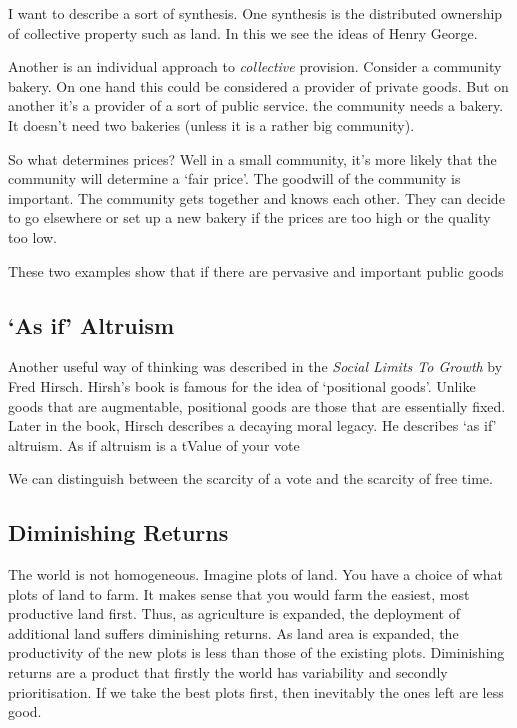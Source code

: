 \documentclass[]{tufte-handout}
\begin{document}
I want to describe a sort of synthesis. One synthesis is the distributed
ownership of collective property such as land. In this we see the ideas
of Henry George.

Another is an individual approach to \emph{collective} provision.
Consider a community bakery. On one hand this could be considered a
provider of private goods. But on another it's a provider of a sort of
public service. the community needs a bakery. It doesn't need two
bakeries (unless it is a rather big community).

So what determines prices? Well in a small community, it's more likely
that the community will determine a `fair price'. The goodwill of the
community is important. The community gets together and knows each
other. They can decide to go elsewhere or set up a new bakery if the
prices are too high or the quality too low.

These two examples show that if there are pervasive and important public
goods

\hypertarget{as-if-altruism}{%
\subsection{`As if' Altruism}\label{as-if-altruism}}

Another useful way of thinking was described in the \emph{Social Limits
To Growth} by Fred Hirsch. Hirsh's book is famous for the idea of
`positional goods'. Unlike goods that are augmentable, positional goods
are those that are essentially fixed. Later in the book, Hirsch
describes a decaying moral legacy. He describes `as if' altruism. As if
altruism is a tValue of your vote

We can distinguish between the scarcity of a vote and the scarcity of
free time.

\hypertarget{diminishing-returns}{%
\subsection{Diminishing Returns}\label{diminishing-returns}}

The world is not homogeneous. Imagine plots of land. You have a choice
of what plots of land to farm. It makes sense that you would farm the
easiest, most productive land first. Thus, as agriculture is expanded,
the deployment of additional land suffers diminishing returns. As land
area is expanded, the productivity of the new plots is less than those
of the existing plots. Diminishing returns are a product that firstly
the world has variability and secondly prioritisation. If we take the
best plots first, then inevitably the ones left are less good.
\end{document}
